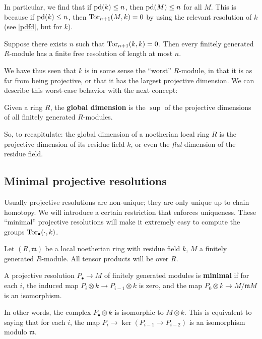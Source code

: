 In particular, we find that if $\mathrm{pd}(k) \leq n$, then $\mathrm{pd}(M) \leq n$ for all
$M$. This is because if $\mathrm{pd}(k) \leq n$, then $\operatorname{Tor}_{n+1}(M, k) = 0$ by using
the relevant resolution of $k$ (see \cref{pdfd}, but for $k$).
\begin{corollary} 
Suppose there exists $n$ such that $\operatorname{Tor}_{n+1}(k, k) = 0$. 
Then every finitely generated $R$-module has a finite free resolution of length
at most $n$.
\end{corollary} 

We have thus seen that $k$ is in some sense the ``worst'' $R$-module, in that it is
as far from being projective, or that it has the largest projective dimension.
We can describe this worst-case behavior with the next concept:

\begin{definition} 
Given a ring $R$, the \textbf{global dimension} is the $\sup$ of the projective
dimensions of all finitely generated $R$-modules. 
\end{definition} 

So, to recapitulate: the global dimension of a noetherian local ring $R$ is the
projective dimension of its residue field $k$, or even the \emph{flat}
dimension of the residue field. 
\subsection{Minimal projective resolutions}
Usually projective resolutions are non-unique; they are only unique up to
chain homotopy. We will introduce a certain restriction that enforces
uniqueness. These ``minimal'' projective resolutions will make it extremely
easy to compute the groups $\operatorname{Tor}_{\bullet}(\cdot, k)$.

Let $(R, \mathfrak{m})$ be a local noetherian ring with residue field $k$, $M$ a
finitely generated $R$-module.
All tensor products will be over $R$.

\begin{definition}
A projective resolution $P_\bullet \to M$ of finitely generated
modules is \textbf{minimal} if for each $i$, the
induced map $P_i \otimes k \to P_{i-1} \otimes
k$ is
zero, and the map $P_0 \otimes k \to
M/\mathfrak{m}M$ is an isomorphism.
\end{definition}

In other words, the complex $P_\bullet \otimes k$ is isomorphic to $M \otimes
k$.
This is equivalent to saying that for each $i$, the map $P_i
\to\ker(P_{i-1}
\to P_{i-2})$ is an isomorphism modulo $\mathfrak{m}$.

